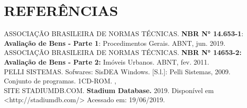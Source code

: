 \section{REFERÊNCIAS}

\noindent ASSOCIAÇÃO BRASILEIRA DE NORMAS TÉCNICAS. \textbf{NBR N° 14.653-1}:\textbf{ Avaliação de Bens - Parte 1}: Procedimentos Gerais. ABNT, jun. 2019.\\ 

ASSOCIAÇÃO BRASILEIRA DE NORMAS TÉCNICAS. \textbf{NBR N° 14653-2: Avaliação de Bens - Parte 2:} Imóveis Urbanos. ABNT, fev. 2011.\\ 

PELLI SISTEMAS. Sofwares:   SisDEA Windows. [S.l.]: Pelli Sistemas, 2009. Conjunto de programas. 1CD-ROM. ,\\

SITE STADIUMDB.COM. \textbf{Stadium Database.} 2019. Disponível em <http://stadiumdb.com/> Acessado em: 19/06/2019.\\ 